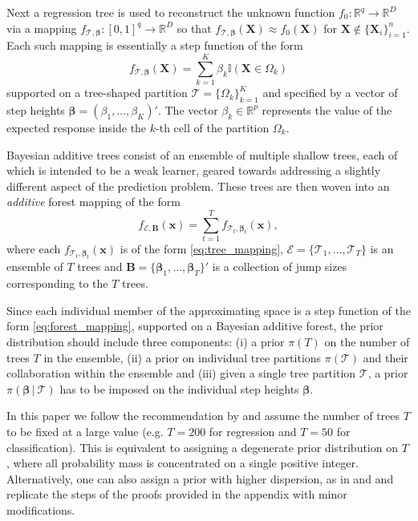 \documentclass[12pt]{article}
\newcommand{\bm}[1]{\boldsymbol{#1}}
\newcommand{\mE}{\mathcal{E}}
\newcommand{\mT}{\mathcal{T}}
\newcommand{\1}{\mathbb{I}}
\def\C {\,|\:}
\def\C {\,|\:}
\def\B{\bm{B}}
\def\b{\bm{\beta}}
\def\X{\bm{X}}
\def\x{\bm{x}}
\def\b{\bm{\beta}}
\def\C{\mbox{\boldmath$C$}}
\def\x{\mbox{\boldmath$x$}}
\def\b{\mbox{\boldmath$b$}}
\def\B{\mbox{\boldmath$B$}}
\def\X{\mbox{\boldmath$X$}}
\def\C {\,|\:}
\def\C {\,|\:}
\def\B{\bm{B}}
\def\b{\bm{\beta}}
\def\X{\bm{X}}
\def\x{\bm{x}}
\def\b{\bm{\beta}}
\theoremstyle{plain}
\theoremstyle{definition}
\theoremstyle{remark}
\begin{document}
Next a regression tree is used to reconstruct the unknown function $f_0: \mathbb{R}^q \rightarrow \mathbb{R}^D$  via a mapping $f_{\mT,{\b}}:[0,1]^q \rightarrow \mathbb{R}^D$   so that $f_{\mT,{\b}} ( \X ) \approx f_0 ( \X ) $ for $ \X \notin \{ \X_i \}_{i=1}^n $.
Each such mapping  is essentially a step function of the form
\begin{equation}\label{eq:tree_mapping}
f_{\mT,{\b}}(\X)=\sum_{k=1}^K\beta_k\mathbb{I}(\X\in\Omega_k)
\end{equation}
supported on a tree-shaped partition $\mT=\{\Omega_k\}_{k=1}^K$ and  specified by a vector of step heights $\b=(\beta_1,\dots,\beta_K)'$.
The vector $\beta_k \in \mathbb{R}^p$ represents the value of the expected response inside the $k$-th cell of the partition $\Omega_k$.

Bayesian additive trees consist of an ensemble of multiple shallow trees, each of which is intended to be a weak learner, geared towards addressing a slightly different aspect of the prediction problem. These trees are then woven into an {\it additive} forest mapping of the form
\begin{equation}\label{eq:forest_mapping}
f_{\mE,{\B}}(\x)=\sum_{t=1}^Tf_{\mT_t,{\b}_t}(\x),
\end{equation}
where each $f_{\mT_t,{\b}_t}(\x)$ is of the form \eqref{eq:tree_mapping}, $\mE=\{\mT_1,\dots,\mT_T\}$ is an ensemble of $T$ trees and $\B=\{\b_1,\dots,\b_T\}'$ is a collection of jump sizes corresponding to the $T$ trees. 

Since each individual member of the approximating space is a step function of the form \eqref{eq:forest_mapping}, supported on a Bayesian additive forest, the prior distribution should include three components: (i) a prior $\pi(T)$ on the number of trees $T$ in the ensemble, (ii) a prior on individual tree partitions $\pi(\mT)$ and their collaboration within the ensemble and (iii) given a single tree partition $\mT$, a prior $\pi(\b\C\mT)$ has to be imposed on the individual step heights $\b$. 

In this paper we follow the recommendation by \cite{chipman2010bart} and assume the number of trees $T$ to be fixed at a large value (e.g. $T=200$ for regression and $T=50$ for classification). This is equivalent to assigning a degenerate prior distribution on $T$, where all probability mass is concentrated on a single positive integer. Alternatively, one can also assign a prior with higher dispersion, as in \cite{rockova2020posterior} and \cite{linero2017bayesian} and replicate the steps of the proofs provided in the appendix with minor modifications. 
\end{document}
